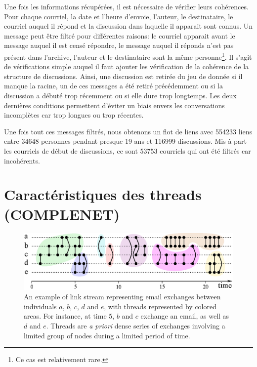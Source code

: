Une fois les informations récupérées, il est nécessaire de vérifier leurs cohérences.
Pour chaque courriel, la date et l'heure d'envoie, l'auteur, le destinataire, le courriel auquel il répond et la discussion dans laquelle il apparait sont connus.
Un message peut être filtré pour différentes raisons: le courriel apparait avant le message auquel il est censé répondre, le message auquel il réponds n'est pas présent dans l'archive, l'auteur et le destinataire sont la même personne\footnote{Ce cas est relativement rare.}.
Il s'agit de vérifications simple auquel il faut ajouter les vérification de la cohérence de la structure de discussions.
Ainsi, une discussion est retirée du jeu de donnée si il manque la racine, un de ces messages a été retiré précédemment ou si la discussion a débuté trop récemment ou si elle dure trop longtemps.
Les deux dernières conditions permettent d'éviter un biais envers les conversations incomplètes car trop longues ou trop récentes.

Une fois tout ces messages filtrés, nous obtenons un flot de liens avec 554233 liens entre 34648 personnes pendant presque 19 ans et 116999 discussions.
Mis à part les courriels de début de discussions, ce sont 53753 courriels qui ont été filtrés car incohérents.

\section{Caractéristiques des threads (COMPLENET)}

\begin{figure}[!h]
\centering

\includegraphics[width=0.9\linewidth]{img/flot_communautes.eps}
\caption{An example of link stream representing email exchanges between individuals $a$, $b$, $c$, $d$ and $e$, with threads represented by colored areas. For instance, at time $5$, $b$ and $c$ exchange an email, as well as $d$ and $e$. Threads are {\em a priori} dense series of exchanges involving a limited group of nodes during a limited period of time.
}
\label{fig:threads-in-ls}
\end{figure}